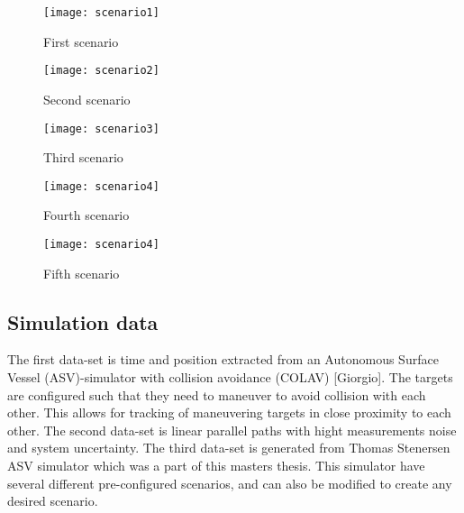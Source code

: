 \begin{figure}
    \centering
    \begin{minipage}{0.49\textwidth}
        \centering
        \texttt{[image: scenario1]}
        \caption{First scenario}
    \end{minipage}
    \begin{minipage}{0.49\textwidth}
        \centering
        \texttt{[image: scenario2]}
        \caption{Second scenario}
    \end{minipage}
\end{figure}
\begin{figure}
    \centering
    \begin{minipage}{0.49\textwidth}
        \centering
        \texttt{[image: scenario3]}
        \caption{Third scenario}
    \end{minipage}
    \begin{minipage}{0.49\textwidth}
        \centering
        \texttt{[image: scenario4]}
        \caption{Fourth scenario}
    \end{minipage}
\end{figure}
\begin{figure}
    \centering
    \begin{minipage}{0.49\textwidth}
        \centering
        \texttt{[image: scenario4]}
        \caption{Fifth scenario}
    \end{minipage}
\end{figure}

\subsection{Simulation data}
The first data-set is time and position extracted from an Autonomous Surface Vessel (ASV)-simulator with collision avoidance (COLAV) [Giorgio]. The targets are configured such that they need to maneuver to avoid collision with each other. This allows for tracking of maneuvering targets in close proximity to each other. The second data-set is linear parallel paths with hight measurements noise and system uncertainty. The third data-set is generated from Thomas Stenersen ASV simulator which was a part of this masters thesis. This simulator have several different pre-configured scenarios, and can also be modified to create any desired scenario.

